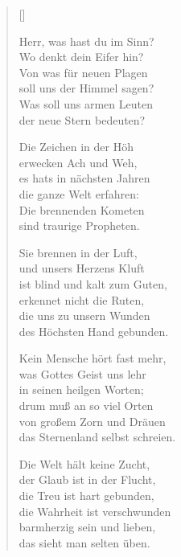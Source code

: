 \begin{multicols}{2}
\settowidth{\versewidth}{Kein Mensche hört fast mehr,}
\begin{verse}[\versewidth]

 Herr, was hast du im Sinn?\\
Wo denkt dein Eifer hin?\\
Von was für neuen Plagen\\
soll uns der Himmel sagen?\\
Was soll uns armen Leuten\\
der neue Stern bedeuten?

 Die Zeichen in der Höh\\
erwecken Ach und Weh,\\
es hats in nächsten Jahren\\
die ganze Welt erfahren:\\
Die brennenden Kometen\\
sind traurige Propheten.

 Sie brennen in der Luft,\\
und unsers Herzens Kluft\\
ist blind und kalt zum Guten,\\
erkennet nicht die Ruten,\\
die uns zu unsern Wunden\\
des Höchsten Hand gebunden.

 Kein Mensche hört fast mehr,\\
was Gottes Geist uns lehr\\
in seinen heilgen Worten;\\
drum muß an so viel Orten\\
von großem Zorn und Dräuen\\
das Sternenland selbst schreien.

 Die Welt hält keine Zucht,\\
der Glaub ist in der Flucht,\\
die Treu ist hart gebunden,\\
die Wahrheit ist verschwunden\\
barmherzig sein und lieben,\\
das sieht man selten üben.


\end{verse}
\end{multicols}
